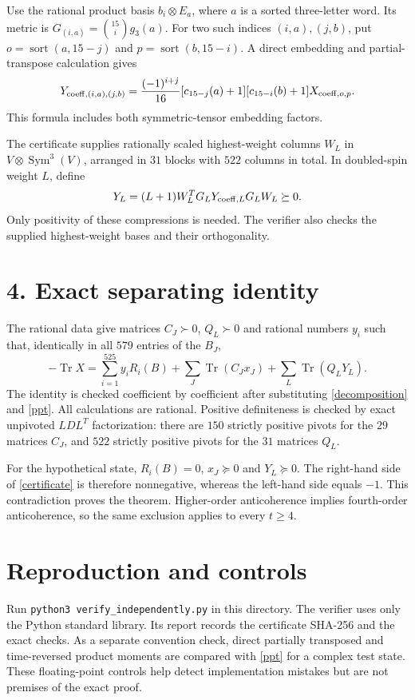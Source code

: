 \documentclass[11pt]{article}
\newcommand{\Tr}{\operatorname{Tr}}
\begin{document}
Use the rational product basis $b_i\otimes E_a$, where $a$ is a sorted
three-letter word. Its metric is
$G_{(i,a)}=\binom{15}{i}g_3(a)$.
For two such indices $(i,a),(j,b)$, put
$o=\operatorname{sort}(a,15-j)$ and
$p=\operatorname{sort}(b,15-i)$.
A direct embedding and partial-transpose calculation gives
\begin{equation}\label{ppt}
 Y_{{\rm coeff},(i,a),(j,b)}=
 \frac{(-1)^{i+j}}{16}
 [c_{15-j}(a)+1][c_{15-i}(b)+1]
 X_{{\rm coeff},o,p}.
\end{equation}
This formula includes both symmetric-tensor embedding factors.

The certificate supplies rationally scaled highest-weight columns $W_L$
in $V\otimes\operatorname{Sym}^{3}(V)$, arranged in $31$ blocks with $522$
columns in total. In doubled-spin weight $L$, define
\[
 Y_L=(L+1)W_L^TG_LY_{{\rm coeff},L}G_LW_L\succeq0.
\]
Only positivity of these compressions is needed. The verifier also checks
the supplied highest-weight bases and their orthogonality.

\section*{4. Exact separating identity}
The rational data give matrices $C_J\succ0$, $Q_L\succ0$ and rational
numbers $y_i$ such that, identically in all $579$ entries of the $B_J$,
\begin{equation}\label{certificate}
 -\Tr X=\sum_{i=1}^{525}y_iR_i(B)
       +\sum_J\Tr(C_Jx_J)+\sum_L\Tr(Q_LY_L).
\end{equation}
The identity is checked coefficient by coefficient after substituting
\eqref{decomposition} and \eqref{ppt}. All calculations are rational.
Positive definiteness is checked by exact unpivoted $LDL^T$ factorization:
there are $150$ strictly positive pivots for the $29$ matrices $C_J$, and
$522$ strictly positive pivots for the $31$ matrices $Q_L$.

For the hypothetical state, $R_i(B)=0$, $x_J\succeq0$ and $Y_L\succeq0$.
The right-hand side of \eqref{certificate} is therefore nonnegative,
whereas the left-hand side equals $-1$. This contradiction proves the
theorem. Higher-order anticoherence implies fourth-order anticoherence,
so the same exclusion applies to every $t\geq4$.

\section*{Reproduction and controls}
Run \texttt{python3 verify\_independently.py} in this directory.
The verifier uses only the Python standard library. Its report records the
certificate SHA-256 and the exact checks.
As a separate convention check, direct partially transposed and time-reversed
product moments are compared with \eqref{ppt} for a complex test state.
These floating-point controls help detect implementation mistakes but are
not premises of the exact proof.
\end{document}
